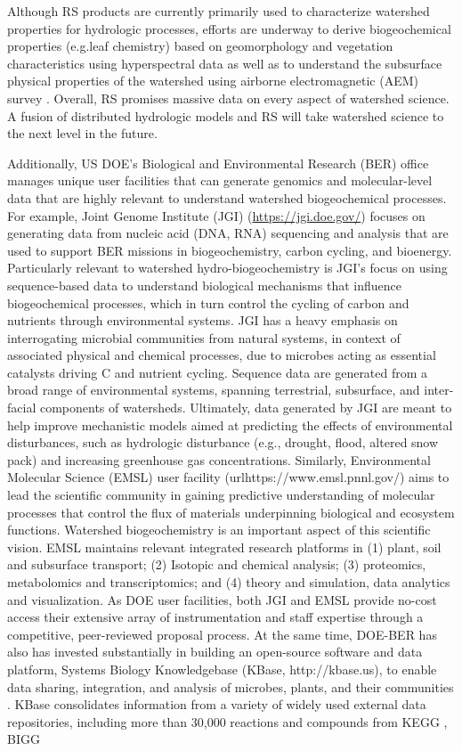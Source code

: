 \documentclass[preprint,review, 12pt]{elsarticle}
\begin{document}
Although RS products are currently primarily used to characterize watershed properties for hydrologic processes, efforts are underway to derive biogeochemical properties (e.g.leaf chemistry) based on geomorphology and vegetation characteristics using hyperspectral data \cite{falco2019investigating} as well as to understand the subsurface physical properties of the watershed using  airborne electromagnetic (AEM) survey \cite{Hubbard2018}. Overall, RS promises massive data on every aspect of watershed science. A fusion of distributed hydrologic models and RS will take watershed science to the next level in the future.

Additionally, US DOE's Biological and Environmental Research (BER) office manages unique user facilities that can generate genomics and molecular-level data that are highly relevant to understand watershed biogeochemical processes. For example, Joint Genome Institute (JGI) (\url{https://jgi.doe.gov/}) focuses on generating data from nucleic acid (DNA, RNA) sequencing and analysis that are used to support BER missions in biogeochemistry, carbon cycling, and bioenergy. Particularly relevant to watershed hydro-biogeochemistry is JGI's focus on using sequence-based data to understand biological mechanisms that influence biogeochemical processes, which in turn control the cycling of carbon and nutrients through environmental systems. JGI has a heavy emphasis on interrogating microbial communities from natural systems, in context of associated physical and chemical processes, due to microbes acting as essential catalysts driving C and nutrient cycling. Sequence data are generated from a broad range of environmental systems, spanning terrestrial, subsurface, and inter-facial components of watersheds. Ultimately, data generated by JGI are meant to help improve mechanistic models aimed at predicting the effects of environmental disturbances, such as hydrologic disturbance (e.g., drought, flood, altered snow pack) and increasing greenhouse gas concentrations. Similarly, Environmental Molecular Science (EMSL) user facility (url{https://www.emsl.pnnl.gov/}) aims to lead the scientific community in gaining predictive understanding of molecular processes that control the flux of materials underpinning biological and ecosystem functions. Watershed biogeochemistry is an important aspect of this scientific vision. EMSL maintains relevant integrated research platforms in (1) plant, soil and subsurface transport; (2) Isotopic and chemical analysis; (3) proteomics, metabolomics and transcriptomics; and (4) theory and simulation, data analytics and visualization. As DOE user facilities, both JGI and EMSL provide no-cost access their extensive array of instrumentation and staff expertise through a competitive, peer-reviewed proposal process. At the same time, DOE-BER has also has invested substantially in building an open-source software and data platform, Systems Biology Knowledgebase (KBase, http://kbase.us), to enable data sharing, integration, and analysis of microbes, plants, and their communities \citep{Arkin2018}. KBase consolidates information from a variety of widely used external data repositories, including more than 30,000 reactions and compounds from KEGG \citep{Kanehisa2000}, BIGG 
\end{document}
